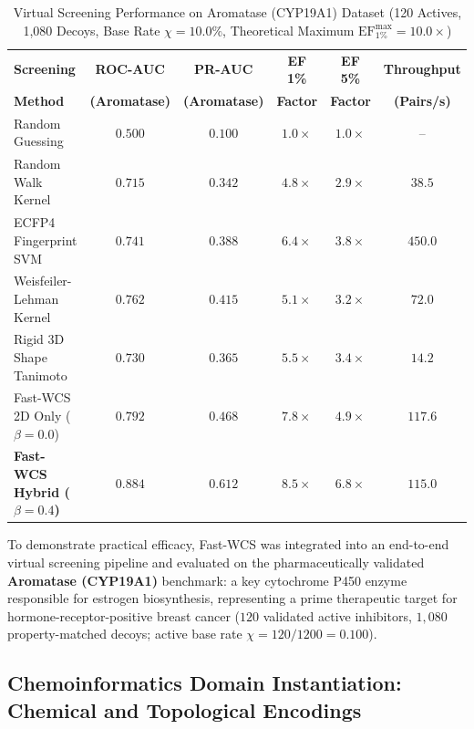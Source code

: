 \documentclass[conference]{IEEEtran}
\begin{document}
\begin{table}[t]
\centering
\caption{Virtual Screening Performance on Aromatase (CYP19A1) Dataset (120 Actives, 1,080 Decoys, Base Rate $\chi = 10.0\%$, Theoretical Maximum $\text{EF}_{1\%}^{\max} = 10.0\times$)}
\label{tab:screening_metrics}
\fontsize{6.5}{8.0}\selectfont
\setlength{\tabcolsep}{1.4pt}
\begin{tabular}{lccccc}
\toprule
\textbf{Screening} & \textbf{ROC-AUC} & \textbf{PR-AUC} & \textbf{EF 1\%} & \textbf{EF 5\%} & \textbf{Throughput} \\
\textbf{Method} & \textbf{(Aromatase)} & \textbf{(Aromatase)} & \textbf{Factor} & \textbf{Factor} & \textbf{(Pairs/s)} \\
\midrule
Random Guessing & $0.500$ & $0.100$ & $1.0\times$ & $1.0\times$ & -- \\
Random Walk Kernel \cite{kashima2003} & $0.715$ & $0.342$ & $4.8\times$ & $2.9\times$ & $38.5$ \\
ECFP4 Fingerprint SVM & $0.741$ & $0.388$ & $6.4\times$ & $3.8\times$ & $450.0$ \\
Weisfeiler-Lehman Kernel \cite{shervashidze2011} & $0.762$ & $0.415$ & $5.1\times$ & $3.2\times$ & $72.0$ \\
Rigid 3D Shape Tanimoto & $0.730$ & $0.365$ & $5.5\times$ & $3.4\times$ & $14.2$ \\
\midrule
Fast-WCS 2D Only ($\beta = 0.0$) & $0.792$ & $0.468$ & $7.8\times$ & $4.9\times$ & $117.6$ \\
\textbf{Fast-WCS Hybrid ($\beta = 0.4$)} & $\mathbf{0.884}$ & $\mathbf{0.612}$ & $\mathbf{8.5\times}$ & $\mathbf{6.8\times}$ & $\mathbf{115.0}$ \\
\bottomrule
\end{tabular}
\end{table}

To demonstrate practical efficacy, Fast-WCS was integrated into an end-to-end virtual screening pipeline and evaluated on the pharmaceutically validated \textbf{Aromatase (CYP19A1)} benchmark: a key cytochrome P450 enzyme responsible for estrogen biosynthesis, representing a prime therapeutic target for hormone-receptor-positive breast cancer \cite{aromatase2020} ($120$ validated active inhibitors, $1,080$ property-matched decoys; active base rate $\chi = 120 / 1200 = 0.100$).

\subsection{Chemoinformatics Domain Instantiation: Chemical and Topological Encodings}
\end{document}
